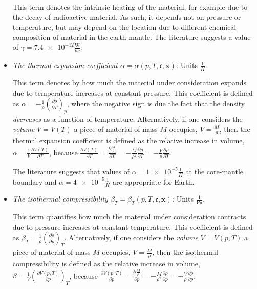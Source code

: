 \documentclass{article}
\begin{document}
\begin{itemize}
  This term denotes the intrinsic heating of the material, for example due to
  the decay of radioactive material. As such, it depends not on pressure or
  temperature, but may depend on the location due to different chemical
  composition of material in the earth mantle. The literature suggests a value
  of $\gamma=\num{7.4e-12}\frac{\textrm{W}}{\si{kg}}$.

\item \textit{The thermal expansion coefficient $\alpha=\alpha(p,T,\mathfrak c ,\mathbf x)$:} Units
  $\frac{1}{\si{K}}$.

  This term denotes by how much the material under consideration
  expands due to temperature increases at constant pressure.
  This coefficient is defined as
  $\alpha = -\frac{1}{\rho} \left(\frac{\partial \rho}{\partial T}\right)_{p}$,
  where the negative sign is due the fact that the density
  \textit{decreases} as a function of temperature. Alternatively, if
  one considers the \textit{volume} $V=V(T)$ a piece of material of mass $M$
  occupies, $V=\frac{M}{\rho}$, then the thermal expansion coefficient
  is defined as the relative increase in volume,
  $\alpha=\frac{1}{V}\frac{\partial V(T)}{\partial T}$, because 
  $\frac{\partial V(T)}{\partial T} =
   \frac{\partial \frac{M}{\rho}}{\partial T} =
   -\frac{M}{\rho^2} \frac{\partial \rho}{\partial T} =
   -\frac{V}{\rho} \frac{\partial \rho}{\partial T}$.

   The literature suggests that values of $\alpha=\num{1e-5}\frac{1}{\si{K}}$ at the core-mantle boundary and $\alpha=\num{4e-5}\frac{1}{\si{K}}$ are appropriate for Earth.

\item \textit{The isothermal compressibility $\beta_T=\beta_T(p,T,\mathfrak c ,\mathbf x)$:} Units
  $\frac{1}{\textrm{Pa}}$.

  This term quantifies how much the material under consideration
  contracts due to pressure increases at constant temperature.
  This coefficient is defined as
  $\beta_T = \frac{1}{\rho} \left( \frac{\partial \rho}{\partial p} \right)_{T}$.
  Alternatively, if
  one considers the \textit{volume} $V=V(p, T)$ a piece of material of mass $M$
  occupies, $V=\frac{M}{\rho}$, then the isothermal compressibility
  is defined as the relative increase in volume,
  $\beta=\frac{1}{V}\left(\frac{\partial V(p, T)}{\partial p}\right)_{T}$, because 
  $\frac{\partial V(p, T)}{\partial p} =
   \frac{\partial \frac{M}{\rho}}{\partial p} =
   -\frac{M}{\rho^2} \frac{\partial \rho}{\partial p} =
   -\frac{V}{\rho} \frac{\partial \rho}{\partial p}$.


\end{itemize}
\end{document}
